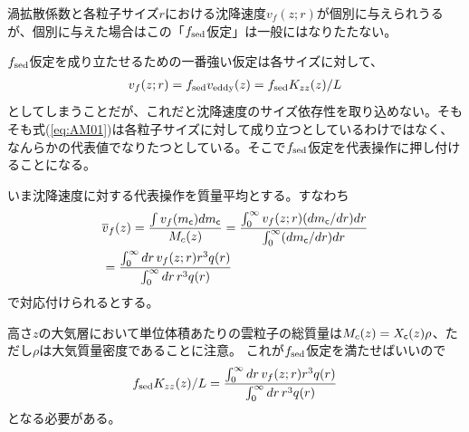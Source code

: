 渦拡散係数と各粒子サイズ$r$における沈降速度$v_f(z; r)$が個別に与えられうるが、個別に与えた場合はこの「$f_\mathrm{sed}$仮定」は一般にはなりたたない。

$f_\mathrm{sed}$仮定を成り立たせるための一番強い仮定は各サイズに対して、
\begin{align}
v_f(z; r)= f_\mathrm{sed} v_\mathrm{eddy}(z) = f_\mathrm{sed} K_{zz}(z)/L 
\end{align}
としてしまうことだが、これだと沈降速度のサイズ依存性を取り込めない。そもそも式(\ref{eq:AM01})は各粒子サイズに対して成り立つとしているわけではなく、なんらかの代表値でなりたつとしている。そこで$f_\mathrm{sed}$仮定を代表操作に押し付けることになる。

いま沈降速度に対する代表操作を質量平均とする。すなわち
\begin{align} 
\label{eq:fsedw}
&\overline{v}_f(z) = \frac{\int v_f(m_{\mathsf{c}}) dm_{\mathsf{c}}}{M_c(z)} = \frac{\int_0^\infty v_f(z; r) (dm_{\mathsf{c}}/dr) dr}{ \int_0^\infty (dm_{\mathsf{c}}/dr) dr } \nonumber \\
&= \frac{\int_0^\infty dr \, v_f(z;r) r^3 q(r)}{ \int_0^\infty dr \, r^3 q(r)}
\end{align}
で対応付けられるとする。


高さ$z$の大気層において単位体積あたりの雲粒子の総質量は$M_c(z) = X_{\mathsf{c}}(z) \rho $、ただし$\rho$は大気質量密度であることに注意。
これが$f_\mathrm{sed}$仮定を満たせばいいので
\begin{align} 
\label{eq:fsedw2}
f_\mathrm{sed} K_{zz}(z)/L = \frac{\int_0^\infty dr \, v_f(z;r) r^3 q(r)}{ \int_0^\infty dr \, r^3 q(r)}
\end{align}
となる必要がある。




